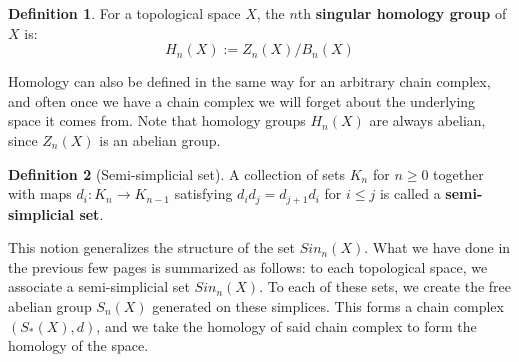 \documentclass[12pt, oneside]{article}   	%
\theoremstyle{definition}
\newtheorem{definition}{Definition}[section]
\begin{document}
\begin{definition}
	For a topological space $X$, the $n$th \textbf{singular homology group} of $X$ is:
	\begin{equation}
		H_n(X) := Z_n(X) / B_n(X)
	\end{equation}
\end{definition}

Homology can also be defined in the same way for an arbitrary chain complex, and often once we have a 
chain complex we will forget about the underlying space it comes from. Note that homology groups 
$H_n(X)$ are always abelian, since $Z_n(X)$ is an abelian group. 

\begin{definition}[Semi-simplicial set]
	A collection of sets $K_n$ for $n\geq 0$ together with maps $d_i : K_n\rightarrow K_{n - 1}$ satisfying $d_i d_j = 
	d_{j + 1}d_i$ for $i\leq j$ is called a \textbf{semi-simplicial set}. 
\end{definition}

This notion generalizes the structure of the set $Sin_n(X)$. What we have done in the previous few pages is summarized 
as follows: to each topological space, we associate a semi-simplicial set $Sin_n(X)$. To each of these sets, we create the 
free abelian group $S_n(X)$ generated on these simplices. This forms a chain complex $(S_*(X), d)$, and we take the 
homology of said chain complex to form the homology of the space. 
\end{document}
